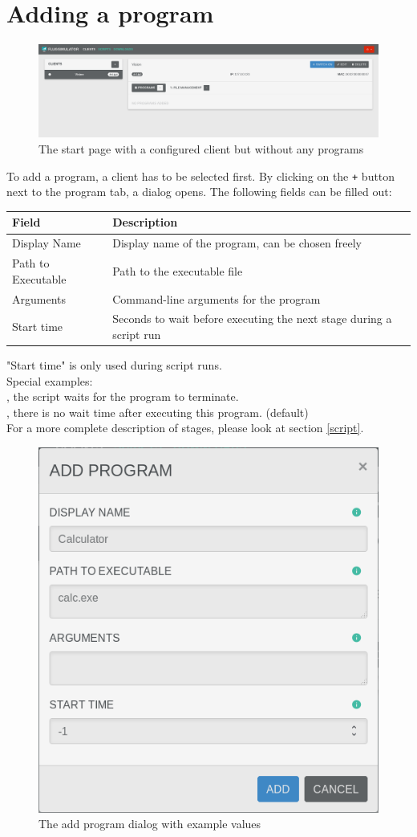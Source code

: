 \documentclass[accentcolor=tud1a, paper=a4, colorback]{tudreport}
\begin{document}
	\section{Adding a program}
	\begin{figure}[h]
		\centering
		\includegraphics[width=.9\textwidth]{startpage_without_programs}
		\caption{The start page with a configured client but without any programs}
		\label{startpage_without_programs}
	\end{figure}
	To add a program, a client has to be selected first. By clicking on the \texttt{+}
	button next to the program tab, a dialog opens. The following fields can be filled
	out:
	\begin{center}
	\begin{tabular}{l|l}
		Field & Description \\\hline
		Display Name &  Display name of the program, can be chosen freely\\
		Path to Executable & Path to the executable file\\
		Arguments & Command-line arguments for the program\\
		Start time & Seconds to wait before executing the next stage during a script run\\
	\end{tabular}
	\end{center}
	"Start time" is only used during script runs.\\
	Special examples:\\
	, the script waits for the program to terminate.\\
	, there is no wait time after executing this program. (default)\\
	For a more complete description of stages, please look at section \ref{script}.

	\begin{figure}[h]
		\centering
		\includegraphics[width=.3\textwidth]{add_program}
		\caption{The add program dialog with example values}
		\label{add_program}
	\end{figure}
\end{document}
